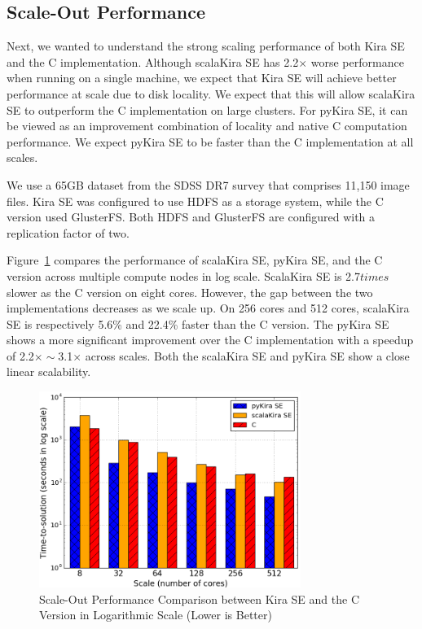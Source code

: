 \documentclass[10pt,journal,compsoc]{IEEEtran}
\begin{document}
\subsection{Scale-Out Performance}
\label{sec:Performance-scaleout}

Next, we wanted to understand the strong scaling performance of both Kira SE and the C
implementation. Although scalaKira SE has 2.2$\times$ worse performance when running on
a single machine, we expect that Kira SE will achieve better performance at scale due
to disk locality. We expect that this will allow scalaKira SE to outperform the C implementation
on large clusters. 
For pyKira SE, it can be viewed as an improvement combination of locality and native C
computation performance. We expect pyKira SE to be faster than the C implementation
at all scales.

We use a 65GB dataset from the SDSS DR7 survey that comprises 11,150 image files.
Kira SE was configured to use HDFS as a storage system, while the C version used GlusterFS. 
Both HDFS and GlusterFS are configured with a replication factor of two.

Figure~\ref{fig:scaleout} compares the performance of scalaKira SE, pyKira SE, and the C version across
multiple compute nodes in log scale. 
ScalaKira SE is 2.7$times$ slower as the C version on eight cores. 
However, the gap between the two implementations decreases as we scale up. 
On 256 cores and 512 cores, scalaKira SE is respectively 5.6\% and 22.4\% faster than the C version.
The pyKira SE shows a more significant improvement over the C implementation with a speedup of
2.2$\times\sim$3.1$\times$ across scales.
Both the scalaKira SE and pyKira SE show a close linear scalability.

\begin{figure}[h]
	\begin{center}
		\includegraphics[width=85mm]{pictures/scaleout}
		\caption{Scale-Out Performance Comparison between Kira SE and the C Version in Logarithmic Scale (Lower is Better)
		\label{fig:scaleout}}
  	\end{center}
\end{figure}
\end{document}
